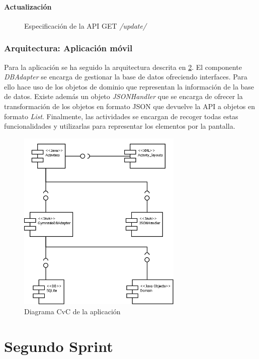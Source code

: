 \documentclass[11pt,a4paper]{report}
\begin{document}
\paragraph{Actualización}
\begin{figure}[H]
	\centering
	
	\caption{Especificación de la API GET \textit{/update/}}
	\label{cod:getDat}
\end{figure}
\subsubsection{Arquitectura: Aplicación móvil}
Para la aplicación se ha seguido la arquitectura descrita en \ref{fig: CvCApp}. El componente \textit{DBAdapter} se encarga de gestionar la base de datos ofreciendo interfaces. Para ello hace uso de los objetos de dominio que representan la información de la base de datos. Existe además un objeto \textit{JSONHandler} que se encarga de ofrecer la transformación de los objetos en formato JSON que devuelve la API a objetos en formato \textit{List}.
Finalmente, las actividades se encargan de recoger todas estas funcionalidades y utilizarlas para representar los elementos por la pantalla.
\begin{figure}[H]
	\centering
	\includegraphics[width=0.7\textwidth]{capturicas/CvCApp.png}
	\caption{Diagrama CvC de la aplicación}
	\label{fig: CvCApp}
\end{figure}
\section{Segundo Sprint}
\end{document}

